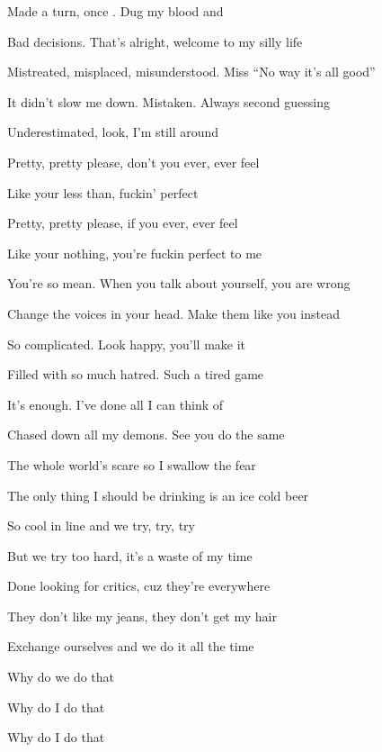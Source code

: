 

\zs
Made a  turn, once .
Dug my  blood and 

Bad decisions. That's alright, welcome to my silly life

Mistreated, misplaced, misunderstood. Miss ``No way it's all good''

It didn't slow me down. Mistaken. Always second guessing

Underestimated, look, I'm still around
\ks

\zr
Pretty, pretty please, don't you ever, ever feel

Like your less than, fuckin' perfect

Pretty, pretty please, if you ever, ever feel

Like your nothing, you're fuckin perfect to me
\kr

\zs
You're so mean. When you talk about yourself, you are wrong

Change the voices in your head. Make them like you instead

So complicated. Look happy, you'll make it

Filled with so much hatred. Such a tired game

It's enough. I've done all I can think of

Chased down all my demons. See you do the same
\ks

\zr
\kr

\zs
The whole world's scare so I swallow the fear

The only thing I should be drinking is an ice cold beer

So cool in line and we try, try, try

But we try too hard, it's a waste of my time

Done looking for critics, cuz they're everywhere

They don't like my jeans, they don't get my hair

Exchange ourselves and we do it all the time

Why do we do that

Why do I do that

Why do I do that
\ks

\zr \kr

\kp
